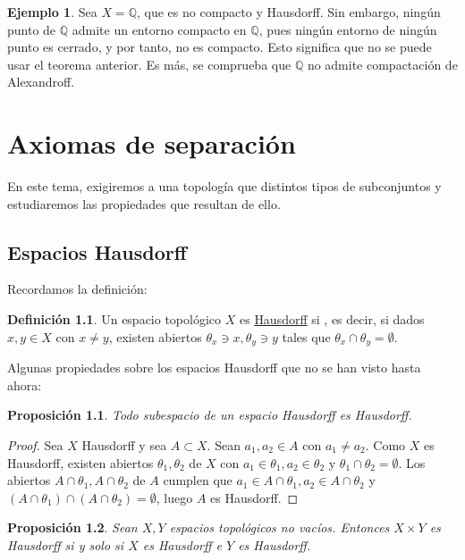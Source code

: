 \documentclass[12pt]{report}
\newtheorem{proposition}{Proposición}[chapter]
\theoremstyle{definition}
\newtheorem{definition}{Definición}[chapter]
\theoremstyle{definition}
\newtheorem{example}{Ejemplo}[chapter]
\theoremstyle{remark}
\newcommand{\Q}{\mathbb Q}
\begin{document}
\begin{example}
Sea $X = \Q$, que es no compacto y Hausdorff. Sin embargo, ningún punto de $\Q$ admite un entorno compacto en $\Q$, pues ningún entorno de ningún punto es cerrado, y por tanto, no es compacto. Esto significa que no se puede usar el teorema anterior. Es más, se comprueba que $\Q$ no admite compactación de Alexandroff.
\end{example}

\chapter{Axiomas de separación}

En este tema, exigiremos a una topología que  distintos tipos de subconjuntos y estudiaremos las propiedades que resultan de ello.

\section{Espacios Hausdorff}

Recordamos la definición:
\begin{definition}
Un espacio topológico $X$ es \underline{Hausdorff} si , es decir, si dados $x,y \in X$ con $x \neq y$, existen abiertos $\theta_x \ni x, \theta_y \ni y$ tales que $\theta_x \cap \theta_y = \emptyset$.
\end{definition}

Algunas propiedades sobre los espacios Hausdorff que no se han visto hasta ahora:

\begin{proposition}
Todo subespacio de un espacio Hausdorff es Hausdorff.
\end{proposition}

\begin{proof}
Sea $X$ Hausdorff y sea $A \subset X$. Sean $a_1,a_2 \in A$ con $a_1 \neq a_2$. Como $X$ es Hausdorff, existen abiertos $\theta_1,\theta_2$ de $X$ con $a_1 \in \theta_1, a_2 \in \theta_2$ y $\theta_1 \cap \theta_2 = \emptyset$. Los abiertos $A \cap \theta_1, A \cap \theta_2$ de $A$ cumplen que $a_1 \in A \cap \theta_1, a_2 \in A \cap \theta_2$ y $(A \cap \theta_1) \cap (A \cap \theta_2) = \emptyset$, luego $A$ es Hausdorff. 
\end{proof}

\begin{proposition}
Sean $X,Y$ espacios topológicos no vacíos. Entonces $X \times Y$ es Hausdorff si y solo si $X$ es Hausdorff e $Y$ es Hausdorff.
\end{proposition}
\end{document}
